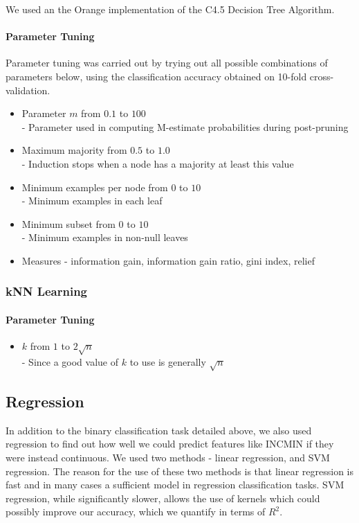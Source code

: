 \documentclass[]{article}
\begin{document}
We used an the Orange implementation of the C4.5 Decision Tree Algorithm.

\paragraph{Parameter Tuning}
Parameter tuning was carried out by trying out all possible combinations of parameters below, using the classification accuracy obtained on 10-fold cross-validation.

\begin{itemize}
	\item Parameter $m$ from $0.1$ to $100$ \\
		- Parameter used in computing M-estimate probabilities during post-pruning
	\item Maximum majority from $0.5$ to $1.0$ \\
		- Induction stops when a node has a majority at least this value
	\item Minimum examples per node from $0$ to $10$ \\
		- Minimum examples in each leaf
	\item Minimum subset from $0$ to $10$ \\
		- Minimum examples in non-null leaves
	\item Measures - information gain, information gain ratio, gini index, relief %
\end{itemize}

\subsubsection{kNN Learning}

\paragraph{Parameter Tuning}
\begin{itemize}
	\item $k$ from $1$ to $2\sqrt{n}$ \\
		- Since a good value of $k$ to use is generally $\sqrt{n}$
\end{itemize}

\subsection{Regression}
In addition to the binary classification task detailed above, we also used regression to find out how well we could predict features like INCMIN if they were instead continuous. We used two methods - linear regression, and SVM regression. The reason for the use of these two methods is that linear regression is fast and in many cases a sufficient model in regression classification tasks. SVM regression, while significantly slower, allows the use of kernels which could possibly improve our accuracy, which we quantify in terms of $R^2$.
\end{document}
